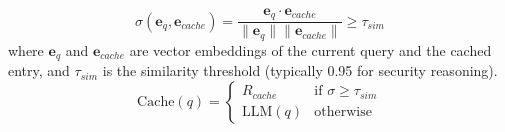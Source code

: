 \begin{equation}
\label{eq:similarity}
\sigma(\mathbf{e}_q, \mathbf{e}_{cache}) = \frac{\mathbf{e}_q \cdot \mathbf{e}_{cache}}{\|\mathbf{e}_q\| \|\mathbf{e}_{cache}\|} \geq \tau_{sim}
\end{equation}
where $\mathbf{e}_q$ and $\mathbf{e}_{cache}$ are vector embeddings of the current query and the cached entry, and $\tau_{sim}$ is the similarity threshold (typically 0.95 for security reasoning).
\begin{equation}
\text{Cache}(q) = 
\begin{cases} 
R_{cache} & \text{if } \sigma \geq \tau_{sim} \\
\text{LLM}(q) & \text{otherwise}
\end{cases}
\end{equation}
